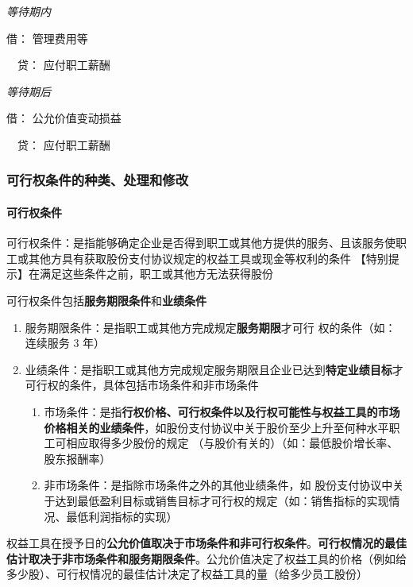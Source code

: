 \documentclass[UTF8,12pt]{ctexart}
\newenvironment{Dr}{\noindent 借：}{\par}
\newenvironment{Cr}{\noindent \ \ 贷：}{\par}
\numberwithin{equation}{section} %
\numberwithin{figure}{section}
\numberwithin{table}{section}
\begin{document}
	\textit{等待期内}
	
	\begin{Dr}
		管理费用等
	\end{Dr}
	\begin{Cr}
		应付职工薪酬
	\end{Cr}
	
	\textit{等待期后}
	
	\begin{Dr}
		公允价值变动损益
	\end{Dr}
	\begin{Cr}
		应付职工薪酬
	\end{Cr}
	
	
	\subsubsection{可行权条件的种类、处理和修改}
	\paragraph{可行权条件}可行权条件：是指能够确定企业是否得到职工或其他方提供的服务、且该服务使职工或其他方具有获取股份支付协议规定的权益工具或现金等权利的条件
	【特别提示】在满足这些条件之前，职工或其他方无法获得股份
	
	可行权条件包括\textbf{服务期限条件}和\textbf{业绩条件}
	\begin{enumerate}
		\item 服务期限条件：是指职工或其他方完成规定\textbf{服务期限}才可行 权的条件（如：连续服务 3 年）
		
		\item 业绩条件：是指职工或其他方完成规定服务期限且企业已达到\textbf{特定业绩目标}才可行权的条件，具体包括市场条件和非市场条件
		\begin{enumerate}
			\item 市场条件：是指\textbf{行权价格、可行权条件以及行权可能性与权益工具的市场价格相关的业绩条件}，如股份支付协议中关于股价至少上升至何种水平职工可相应取得多少股份的规定
			（与股价有关的）（如：最低股价增长率、股东报酬率）
			
			\item 非市场条件：是指除市场条件之外的其他业绩条件，如 股份支付协议中关于达到最低盈利目标或销售目标才可行权的规定（如：销售指标的实现情况、最低利润指标的实现）
		\end{enumerate}
	\end{enumerate}
	
	权益工具在授予日的\textbf{公允价值取决于市场条件和非可行权条件}。\textbf{可行权情况的最佳估计取决于非市场条件和服务期限条件}。公允价值决定了权益工具的价格（例如给多少股）、可行权情况的最佳估计决定了权益工具的量（给多少员工股份）
	
\end{document}
